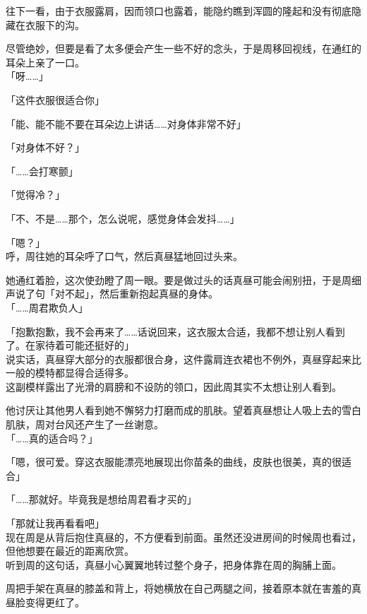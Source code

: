 往下一看，由于衣服露肩，因而领口也露着，能隐约瞧到浑圆的隆起和没有彻底隐藏在衣服下的沟。

尽管绝妙，但要是看了太多便会产生一些不好的念头，于是周移回视线，在通红的耳朵上亲了一口。\\

「呀……」

「这件衣服很适合你」

「能、能不能不要在耳朵边上讲话……对身体非常不好」

「对身体不好？」

「……会打寒颤」

「觉得冷？」

「不、不是……那个，怎么说呢，感觉身体会发抖……」

「嗯？」\\

呼，周往她的耳朵呼了口气，然后真昼猛地回过头来。

她通红着脸，这次使劲瞪了周一眼。要是做过头的话真昼可能会闹别扭，于是周细声说了句「对不起」，然后重新抱起真昼的身体。\\

「……周君欺负人」

「抱歉抱歉，我不会再来了……话说回来，这衣服太合适，我都不想让别人看到了。在家待着可能还挺好的」\\

说实话，真昼穿大部分的衣服都很合身，这件露肩连衣裙也不例外，真昼穿起来比一般的模特都显得合适得多。\\

这副模样露出了光滑的肩膀和不设防的领口，因此周其实不太想让别人看到。

他讨厌让其他男人看到她不懈努力打磨而成的肌肤。望着真昼想让人吸上去的雪白肌肤，周对台风还产生了一丝谢意。\\

「……真的适合吗？」

「嗯，很可爱。穿这衣服能漂亮地展现出你苗条的曲线，皮肤也很美，真的很适合」

「……那就好。毕竟我是想给周君看才买的」

「那就让我再看看吧」\\

现在周是从背后抱住真昼的，不方便看到前面。虽然还没进房间的时候周也看过，但他想要在最近的距离欣赏。\\

听到周的这句话，真昼小心翼翼地转过整个身子，把身体靠在周的胸脯上面。

周把手架在真昼的膝盖和背上，将她横放在自己两腿之间，接着原本就在害羞的真昼脸变得更红了。\\

